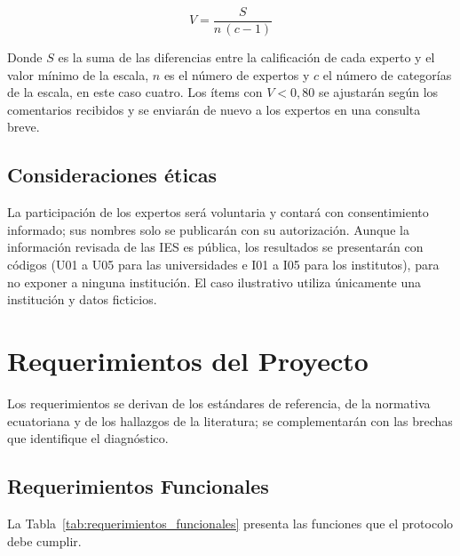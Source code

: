 \begin{equation}
\label{eq:aiken}
V = \frac{S}{n\,(c-1)}
\end{equation}

Donde $S$ es la suma de las diferencias entre la calificación de cada experto y el valor mínimo de la escala, $n$ es el número de expertos y $c$ el número de categorías de la escala, en este caso cuatro. Los ítems con $V < 0{,}80$ se ajustarán según los comentarios recibidos y se enviarán de nuevo a los expertos en una consulta breve.

\subsection{Consideraciones éticas}
La participación de los expertos será voluntaria y contará con consentimiento informado; sus nombres solo se publicarán con su autorización. Aunque la información revisada de las IES es pública, los resultados se presentarán con códigos (U01 a U05 para las universidades e I01 a I05 para los institutos), para no exponer a ninguna institución. El caso ilustrativo utiliza únicamente una institución y datos ficticios.

\section{Requerimientos del Proyecto}
Los requerimientos se derivan de los estándares de referencia, de la normativa ecuatoriana y de los hallazgos de la literatura; se complementarán con las brechas que identifique el diagnóstico.

\subsection{Requerimientos Funcionales}
La Tabla~\ref{tab:requerimientos_funcionales} presenta las funciones que el protocolo debe cumplir.

